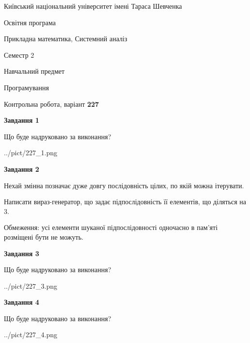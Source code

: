 \documentclass[12pt, ukrainian]{article}
\begin{document}
{{\begin {small}\par
{ \center  Київський національний університет імені Тараса Шевченка \par}
{\parbox {5 cm}{Освітня програма \hfill}{\parbox {8 cm}{Прикладна математика, Системний аналіз \hfill}}\parbox {5 cm}{\hfill Семестр 2}}\par
{\parbox {5 cm} {Навчальний предмет \hfill}\parbox {7 cm}{Програмування \hfill}\parbox {6cm}{\hfill}\par}\vspace{-7pt} \end{small}}{\center Контрольна робота, варіант  \No \textbf
{ 227 }\par}}
{
\begin {large}
{\begin {center}\textbf{Завдання 1}\end {center}}\par
Що буде надруковано за виконання?\par\par
\begin{center}
	{../pict/227_1.png}
\end{center}
\newpage

{\begin {center}\textbf{Завдання 2}\end {center}}\par
Нехай змінна  позначає дуже довгу послідовність цілих, по якій можна ітерувати.

Написати вираз-генератор, що задає підпослідовність її елементів, що діляться на 3.

Обмеження: усі елементи шуканої підпослідовності одночасно в пам'яті розміщені бути не можуть.\par
\newpage

{\begin {center}\textbf{Завдання 3}\end {center}}\par
Що буде надруковано за виконання?\par
\begin{center}
	{../pict/227_3.png}
\end{center}
\newpage

{\begin {center}\textbf{Завдання 4}\end {center}}\par
Що буде надруковано за виконання?\par
\begin{center}
	{../pict/227_4.png}
\end{center}
\newpage


\end{large}}
\end{document}
